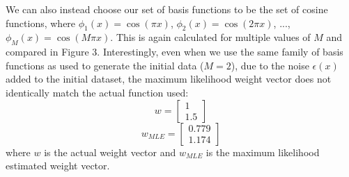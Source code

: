 \documentclass{article}
\begin{document}
We can also instead choose our set of basis functions to be the set of cosine functions, where $\phi_1(x) = \cos(\pi x)$, $\phi_2(x) = \cos(2 \pi x)$, ..., $\phi_M(x) = \cos(M \pi x)$. This is again calculated for multiple values of $M$ and compared in Figure 3. Interestingly, even when we use the same family of basis functions as used to generate the initial data ($M=2$), due to the noise $\epsilon(x)$ added to the initial dataset, the maximum likelihood weight vector does not identically match the actual function used:
$$ w =
\begin{bmatrix}
  1 \\
  1.5
\end{bmatrix}$$
$$ w_{MLE} =
\begin{bmatrix}
  0.779 \\
  1.174
\end{bmatrix}$$
where $w$ is the actual weight vector and $w_{MLE}$ is the maximum likelihood estimated weight vector.
\end{document}
